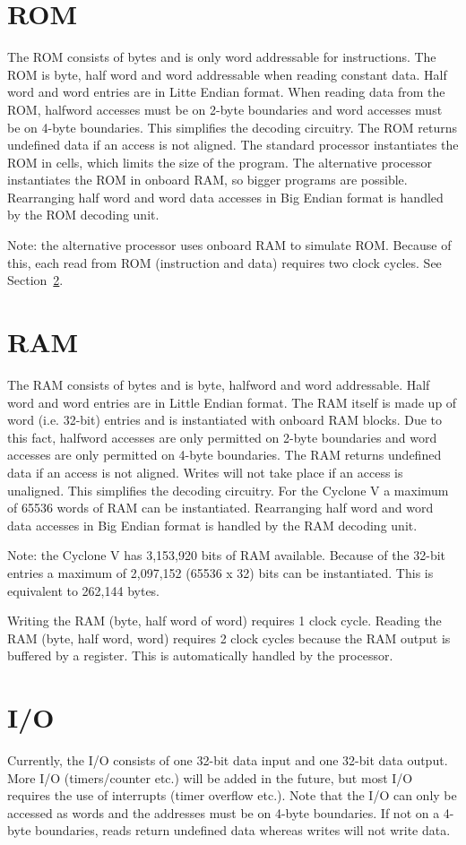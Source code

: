 \documentclass[12pt]{article}
\begin{document}
\section{ROM}
\label{sec:rom}
The ROM consists of bytes and is only word addressable for instructions. The ROM is byte, half word and word addressable when reading constant data. Half word and word entries are in Litte Endian format. When reading data from the ROM, halfword accesses must be on 2-byte boundaries and word accesses must be on 4-byte boundaries. This simplifies the decoding circuitry. The ROM returns undefined data if an access is not aligned. The standard processor instantiates the ROM in cells, which limits the size of the program. The alternative processor instantiates the ROM in onboard RAM, so bigger programs are possible. Rearranging half word and word data accesses in Big Endian format is handled by the ROM decoding unit.

Note: the alternative processor uses onboard RAM to simulate ROM. Because of this, each read from ROM (instruction and data) requires two clock cycles. See Section~\ref{sec:ram}.

\section{RAM}
\label{sec:ram}
The RAM consists of bytes and is byte, halfword and word addressable. Half word and word entries are in Little Endian format. The RAM itself is made up of word (i.e. 32-bit) entries and is instantiated with onboard RAM blocks. Due to this fact, halfword accesses are only permitted on 2-byte boundaries and word accesses are only permitted on 4-byte boundaries. The RAM returns undefined data if an access is not aligned. Writes will not take place if an access is unaligned. This simplifies the decoding circuitry. For the Cyclone V a maximum of 65536 words of RAM can be instantiated. Rearranging half word and word data accesses in Big Endian format is handled by the RAM decoding unit.

Note: the Cyclone V has 3,153,920 bits of RAM available. Because of the 32-bit entries a maximum of 2,097,152 (65536 x 32) bits can be instantiated. This is equivalent to 262,144 bytes.

Writing the RAM (byte, half word of word) requires 1 clock cycle. Reading the RAM (byte, half word, word) requires 2 clock cycles because the RAM output is buffered by a register. This is automatically handled by the processor.

\section{I/O}
\label{sec/io}
Currently, the I/O consists of one 32-bit data input and one 32-bit data output. More I/O (timers/counter etc.) will be added in the future, but most I/O requires the use of interrupts (timer overflow etc.). Note that the I/O can only be accessed as words and the addresses must be on 4-byte boundaries. If not on a 4-byte boundaries, reads return undefined data whereas writes will not write data.
\end{document}
